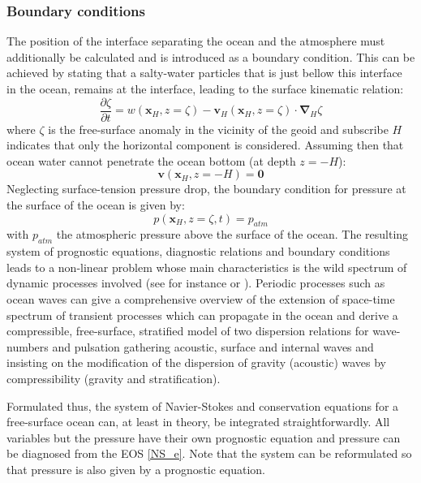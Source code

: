 \subsubsection{Boundary conditions}
The position of the interface separating the ocean and the atmosphere must additionally be calculated and is introduced as a boundary condition. This can be achieved by stating that a salty-water particles that is just bellow this interface in the ocean, remains at the interface, leading to the surface kinematic relation:
\begin{equation}
  \displaystyle
  \label{NS_BC2}
  \frac{\partial \zeta}{\partial t}=w(\mathbf{x}_{\scriptscriptstyle H},z=\zeta)-\mathbf{v}_H(\mathbf{x}_{\scriptscriptstyle H},z=\zeta)\cdot\mathbf{\nabla}_H\zeta
\end{equation}
where $\zeta$ is the free-surface anomaly in the vicinity of the geoid and subscribe $H$ indicates that only the horizontal component is considered. Assuming then that ocean water cannot penetrate the ocean bottom (at depth $z=-H$):
\begin{equation}
 \displaystyle
 \label{NS_BC0}
  \mathbf{v}(\mathbf{x}_{\scriptscriptstyle H},z=-H)=\mathbf{0}
\end{equation}
Neglecting surface-tension pressure drop, the boundary condition for pressure at the surface of the ocean is given by:
\begin{equation}
 \displaystyle
 \label{NS_BC1}
  p(\mathbf{x}_{\scriptscriptstyle H},z=\zeta,t)= p_{atm}
\end{equation}
with $p_{atm}$ the atmospheric pressure above the surface of the ocean.
The resulting system of prognostic equations, diagnostic relations and boundary conditions leads to a non-linear problem whose main characteristics is the wild spectrum of dynamic processes involved (see for instance \cite{gill_atmosphere-ocean_1982} or \cite{vallis_atmospheric_2006}). Periodic processes such as ocean waves can give a comprehensive overview of the extension of space-time spectrum of transient processes which can propagate in the ocean and \cite{auclair_modied_2021} derive a compressible, free-surface, stratified model of two dispersion relations for wave-numbers and pulsation gathering acoustic, surface and internal waves and insisting on the modification of the dispersion of gravity (acoustic) waves by compressibility (gravity and stratification).

Formulated thus, the system of Navier-Stokes and conservation equations for a free-surface ocean can, at least in theory, be integrated straightforwardly. All variables but the pressure have their own prognostic equation and pressure can be diagnosed from the EOS \ref{NS_e}. Note that the system can be reformulated so that pressure is also given by a prognostic equation.

